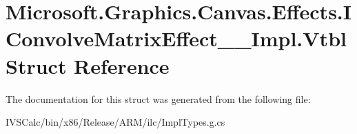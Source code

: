 \hypertarget{struct_microsoft_1_1_graphics_1_1_canvas_1_1_effects_1_1_i_convolve_matrix_effect_____impl_1_1_vtbl}{}\section{Microsoft.\+Graphics.\+Canvas.\+Effects.\+I\+Convolve\+Matrix\+Effect\+\_\+\+\_\+\+Impl.\+Vtbl Struct Reference}
\label{struct_microsoft_1_1_graphics_1_1_canvas_1_1_effects_1_1_i_convolve_matrix_effect_____impl_1_1_vtbl}


The documentation for this struct was generated from the following file\+:\begin{DoxyCompactItemize}
\item 
I\+V\+S\+Calc/bin/x86/\+Release/\+A\+R\+M/ilc/Impl\+Types.\+g.\+cs\end{DoxyCompactItemize}
